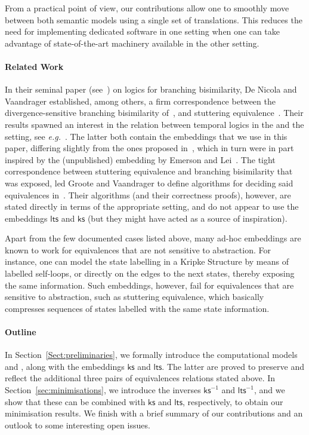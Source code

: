 \documentclass{llncs}
\newcommand{\lts}{\mathsf{lts}}
\newcommand{\ltsrev}{\lts^{-1}}
\newcommand{\ks}{\mathsf{ks}}
\newcommand{\ksrev}{\ks^{-1}}
\newcommand{\eg}{\emph{e.g.}}
\begin{document}
From a practical point of view, our contributions allow one to smoothly
move between both semantic models using a single set of translations.
This reduces the need for implementing dedicated software in one setting
when one can take advantage of state-of-the-art machinery available in
the other setting.

\paragraph{Related Work}

In their seminal paper (see~\cite{DBLP:journals/jacm/NicolaV95})
on logics for branching bisimilarity, De Nicola and Vaandrager
established, among others, a firm correspondence between the
divergence-sensitive branching bisimilarity of~\cite{vanGlabbeek96},
and stuttering equivalence~\cite{DBLP:journals/tcs/BrowneCG88}.
Their results spawned an interest in the relation
between temporal logics in the \LTS and the \KS setting, see
\eg~\cite{DBLP:journals/cn/NicolaFGR93,DBLP:conf/litp/NicolaV90}. The
latter both contain the embeddings that we use in this paper, differing
slightly from the ones proposed in~\cite{DBLP:journals/jacm/NicolaV95},
which in turn were in part inspired by the (unpublished) embedding
by Emerson and Lei~\cite{EL:84}.  The tight correspondence between
stuttering equivalence and branching bisimilarity that was exposed,
led Groote and Vaandrager to define algorithms for deciding said
equivalences in~\cite{DBLP:conf/icalp/GrooteV90}. Their algorithms
(and their correctness proofs), however, are stated directly in terms of
the appropriate setting, and do not appear to use the embeddings $\lts$
and $\ks$ (but they might have acted as a source of inspiration).

Apart from the few documented cases listed above, many ad-hoc
embeddings are known to work for equivalences that are not sensitive to
abstraction. For instance, one can model the state labelling in a Kripke
Structure by means of labelled self-loops, or directly on the edges to
the next states, thereby exposing the same information. Such embeddings,
however, fail for equivalences that are sensitive to abstraction, such
as stuttering equivalence, which basically compresses sequences of states
labelled with the same state information.

\paragraph{Outline} In Section~\ref{Sect:preliminaries}, we formally
introduce the computational models \KS and \LTS, along with the
embeddings $\ks$ and $\lts$. The latter are proved to preserve and
reflect the additional three pairs of equivalences relations stated
above. In Section~\ref{sec:minimisations}, we introduce the inverses
$\ksrev$ and $\ltsrev$, and we show that these can be combined with
$\ks$ and $\lts$, respectively, to obtain our minimisation results.
We finish with a brief summary of our contributions and an outlook to
some interesting open issues.
\end{document}
